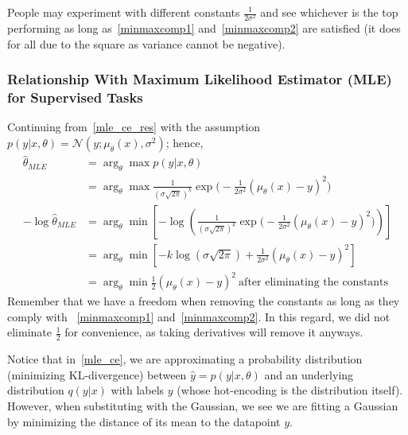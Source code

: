 \documentclass{book}
\numberwithin{equation}{subsection}
\begin{document}
People may experiment with different constants $\frac{1}{2\sigma^2}$ and see whichever is the top performing as long as~\ref{minmaxcomp1} and~\ref{minmaxcomp2} are satisfied (it does for all due to the square as variance cannot be negative).
\subsubsection{Relationship With Maximum Likelihood Estimator (MLE) for Supervised Tasks}
\label{mle_mse}
Continuing from~\ref{mle_ce_res} with the assumption $p(y|x,\theta) = \mathcal{N}(y; \mu_\theta(x),\sigma^2)$; hence,
\begin{align}
    \hat{\theta}_{MLE}
    &= \arg_\theta \max p(y|x,\theta)\\
    &= \arg_\theta \max \frac{1}{(\sigma\sqrt{2\pi})^k}\exp\Big(-\frac{1}{2\sigma^2}(\mu_\theta(x)-y)^2\Big)\\
    -\log\hat{\theta}_{MLE} &= \arg_\theta\min\left[-\log\left(\frac{1}{(\sigma\sqrt{2\pi})^k}\exp\Big(-\frac{1}{2\sigma^2}(\mu_\theta(x)-y)^2\Big)\right)\right]\\
    &= \arg_\theta\min[-k\log(\sigma\sqrt{2\pi}) + \frac{1}{2\sigma^2}(\mu_\theta(x)-y)^2]\\
    &= \arg_\theta \min\frac{1}{2}(\mu_\theta(x)-y)^2\ \text{after eliminating the constants}
    \label{mse_derivation_res1}
\end{align}
Remember that we have a freedom when removing the constants as long as they comply with ~\ref{minmaxcomp1} and~\ref{minmaxcomp2}. In this regard, we did not eliminate $\frac{1}{2}$ for convenience, as taking derivatives will remove it anyways.

Notice that in~\ref{mle_ce}, we are approximating a probability distribution (minimizing KL-divergence) between $\hat{y} = p(y|x,\theta)$ and an underlying distribution $q(y|x)$ with labels $y$ (whose hot-encoding is the distribution itself). However, when substituting with the Gaussian, we see we are fitting a Gaussian by minimizing the distance of its mean to the datapoint $y$.
\end{document}
